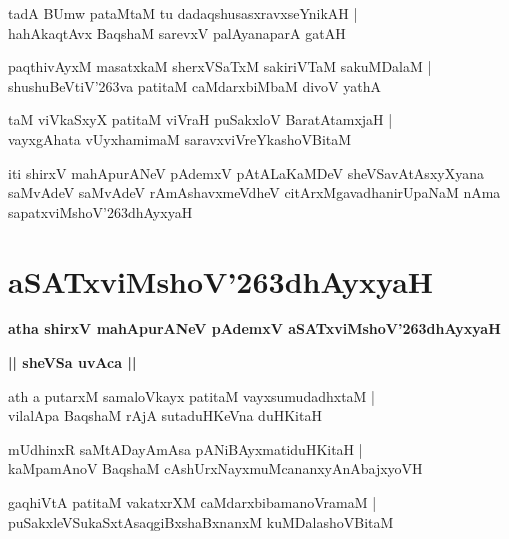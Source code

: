 \documentclass[twoside,12pt,openright]{book}
\def\S{\char'263}
\newcounter{shloka}[chapter]
\def\uvaca#1{\centerline{{\large\textbf{#1}}}}
\begin{document}
\begin{shloka}%
tadA BUmw pataMtaM tu dadaqshusasxravxseYnikAH |\\
hahAkaqtAvx BaqshaM sarevxV palAyanaparA gatAH
\end{shloka}

\begin{shloka}%
paqthivAyxM masatxkaM sherxVSaTxM  sakiriVTaM sakuMDalaM |\\
shushuBeVtiV\S va patitaM caMdarxbiMbaM  divoV yathA 
\end{shloka}

\begin{shloka}%
taM viVkaSxyX patitaM viVraH puSakxloV BaratAtamxjaH |\\
vayxgAhata vUyxhamimaM saravxviVreYkashoVBitaM 
\end{shloka}

\begin{center}
iti shirxV mahApurANeV pAdemxV pAtALaKaMDeV sheVSavAtAsxyXyana saMvAdeV 
saMvAdeV rAmAshavxmeVdheV citArxMgavadhanirUpaNaM nAma sapatxviMshoV\S dhAyxyaH
\end{center}

\chapter{aSATxviMshoV\S dhAyxyaH}

\begin{center}
{\LARGE\bfseries atha shirxV mahApurANeV pAdemxV  aSATxviMshoV\S dhAyxyaH}
\end{center}

\uvaca{|| sheVSa uvAca ||}

\begin{shloka}%
ath a putarxM samaloVkayx patitaM vayxsumudadhxtaM |\\
vilalApa BaqshaM rAjA sutaduHKeVna duHKitaH
\end{shloka}

\begin{shloka}%
mUdhinxR saMtADayAmAsa pANiBAyxmatiduHKitaH |\\
kaMpamAnoV BaqshaM cAshUrxNayxmuMcananxyAnAbajxyoVH
\end{shloka}

\begin{shloka}%
gaqhiVtA patitaM vakatxrXM caMdarxbibamanoVramaM |\\
puSakxleVSukaSxtAsaqgiBxshaBxnanxM kuMDalashoVBitaM 
\end{shloka}
\end{document}
